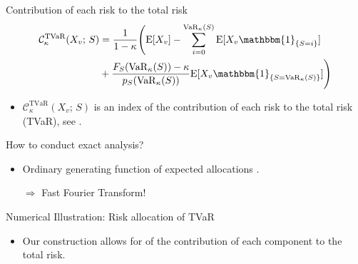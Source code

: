 \documentclass[11pt,xcolor={dvipsnames},hyperref={pdftex,pdfpagemode=UseNone,hidelinks,pdfdisplaydoctitle=true},usepdftitle=false]{beamer}
\begin{document}
\begin{frame}{Contribution of each risk to the total risk}
\begin{align*}
 \mathcal{C}^{\mathrm{TVaR}}_{\kappa}(X_v;\, S) 
  &= \frac{1}{1-\kappa}\Bigg( \mathrm{E}[X_v] -  \sum_{i=0}^{\mathrm{VaR}_{\kappa}(S)}\mathrm{E}[X_v\mathbbm{1}_{\{S=i\}}]\\
  &+ \frac{F_S(\mathrm{VaR}_{\kappa}(S))-\kappa}{p_S(\mathrm{VaR}_{\kappa}(S))} \mathrm{E}[X_v\mathbbm{1}_{\{S=\mathrm{VaR}_{\kappa}(S)\}}]\Bigg)
\end{align*}
\begin{itemize}
    \item $\mathcal{C}^{\mathrm{TVaR}}_{\kappa}(X_v;\, S)$ is an index of the contribution of each risk to the total risk (TVaR), see \cite{tasche2007capital}.
\end{itemize}
\pause
\vfill
How to conduct exact analysis?
\vfill
\pause
\begin{itemize}
    \item Ordinary generating function of expected allocations \citep{blier2025efficient}.
    \item[$\Rightarrow$] Fast Fourier Transform!
\end{itemize}
\end{frame}

\begin{frame}{Numerical Illustration: Risk allocation of TVaR}
\begin{itemize}
    \item Our construction allows for  of
        the contribution of each component to the total risk.
\end{itemize}
\vfill
\begin{center}
\vspace{-0.5cm}

\end{center}
\end{frame}
\end{document}

